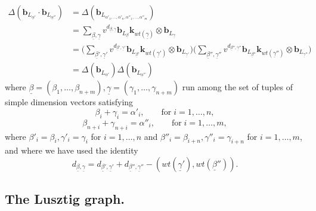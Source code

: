 \documentclass[a4paper,10pt]{amsart}
\def\a{\alpha}
\numberwithin{equation}{section}
\begin{document}
\begin{equation*}
\begin{split}
\Delta(\mathbf{b}_{L_{\underline{\a}'}} \cdot \mathbf{b}_{L_{\underline{\a}''}}) 
&=\Delta(\mathbf{b}_{L_{\a'_1, \ldots, \a'_n,\a''_1, \ldots, \a''_m}})\\
&=\sum_{\underline{\beta},\underline{\gamma}} v^{d_{\underline{\beta},\underline{\gamma}}} \mathbf{b}_{L_{\underline{\beta}}} \mathbf{k}_{wt(\underline{\gamma})} \otimes \mathbf{b}_{L_{\underline{\gamma}}}\\
&=\big( \sum_{\underline{\beta}',\underline{\gamma}'} v^{d_{\underline{\beta}',\underline{\gamma}'}} \mathbf{b}_{L_{\underline{\beta}'}} \mathbf{k}_{wt(\underline{\gamma}')} \otimes \mathbf{b}_{L_{\underline{\gamma}'}}\big) \big(\sum_{\underline{\beta}'',\underline{\gamma}''} v^{d_{\underline{\beta}'',\underline{\gamma}''}} \mathbf{b}_{L_{\underline{\beta}''}} \mathbf{k}_{wt(\underline{\gamma}'')} \otimes \mathbf{b}_{L_{\underline{\gamma}''}}\big)\\
&=\Delta (\mathbf{b}_{L_{\underline{\a}'}}) \Delta(\mathbf{b}_{L_{\underline{\a}''}})
\end{split}
\end{equation*}
where $\underline{\beta}=(\beta_1, \ldots, \beta_{n+m}), \underline{\gamma}=(\gamma_1, \ldots, \gamma_{n+m})$ run among the set of tuples of simple dimension vectors satisfying
$$\beta_i+\gamma_i=\a'_i, \qquad \text{for}\; i=1, \ldots, n, $$
$$\beta_{n+i}+\gamma_{n+i}=\a''_i, \qquad \text{for}\; i=1, \ldots, m, $$
where $\beta'_i=\beta_i, \gamma'_i=\gamma_i$ for $i=1, \ldots, n$ and $\beta''_i =\beta_{i+n}, \gamma''_i=\gamma_{i+n}$ for $i=1, \ldots, m$, and where we have used the identity
$$d_{\underline{\beta},\underline{\gamma}}=d_{\underline{\beta}', \underline{\gamma}'} + d_{\underline{\beta}'', \underline{\gamma}''} -(wt(\underline{\gamma}'), wt(\underline{\beta}'')).$$

\vspace{.2in}

\subsection{The Lusztig graph.}

\vspace{.15in}
\end{document}

